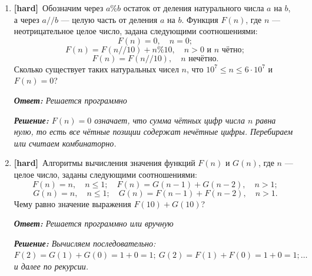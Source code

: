 \documentclass[a4paper]{article}
\newcommand{\hardtag}{\textcolor{hardcolor}{\textbf{[hard]}}}
\newcommand{\answer}[1]{\par\smallskip\textit{\textbf{Ответ:} #1}}
\newcommand{\solution}[1]{\par\textit{\textbf{Решение:} #1}}
\begin{document}
\begin{enumerate}[label=\textbf{Задача \arabic*.}, leftmargin=*, itemsep=10mm]
  \bigskip

  \item %
  \hardtag\ Обозначим через $a\%b$ остаток от деления натурального числа $a$ на $b$,
  а через $a//b$ — целую часть от деления $a$ на $b$.
  Функция $F(n)$, где $n$ — неотрицательное целое число, задана следующими соотношениями:
  \[
    F(n) = 0,\quad n = 0;
  \]
  \[
    F(n) = F(n//10) + n\%10,\quad n > 0 \text{ и } n \text{ чётно};
  \]
  \[
    F(n) = F(n//10),\quad n \text{ нечётно}.
  \]
  Сколько существует таких натуральных чисел $n$, что $10^7 \leq n \leq 6\cdot10^7$ и $F(n) = 0$?
  \answer{Решается программно}
  \solution{$F(n)=0$ означает, что сумма чётных цифр числа $n$ равна нулю, то есть все чётные позиции содержат нечётные цифры. Перебираем или считаем комбинаторно.}

  \bigskip

  \item %
  \hardtag\ Алгоритмы вычисления значения функций $F(n)$ и $G(n)$, где $n$ — целое число,
  заданы следующими соотношениями:
  \[
    F(n) = n,\quad n \leq 1;\quad F(n) = G(n-1) + G(n-2),\quad n > 1;
  \]
  \[
    G(n) = n,\quad n \leq 1;\quad G(n) = F(n-1) + F(n-2),\quad n > 1.
  \]
  Чему равно значение выражения $F(10) + G(10)$?
  \answer{Решается программно или вручную}
  \solution{Вычисляем последовательно: $F(2)=G(1)+G(0)=1+0=1;\ G(2)=F(1)+F(0)=1+0=1;\ldots$ и далее по рекурсии.}

\end{enumerate}
\end{document}
